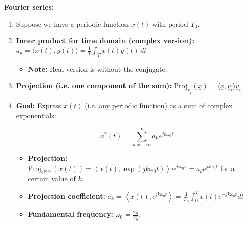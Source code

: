         \begin{example}
            \textbf{Fourier series:}
            \begin{enumerate}
                \item Suppose we have a periodic function $x(t)$ with period $T_0$.

                \begin{center}
                \end{center}

                \item \textbf{Inner product for time domain (complex version):} $a_k = \langle x(t), y(t) \rangle = \frac{1}{T} \int_{T} x(t) \overline{y(t)} \, dt$
                \begin{itemize}
                    \item \textbf{Note:} Real version is without the conjugate.
                \end{itemize}
                \item \textbf{Projection (i.e. one component of the sum):} $\text{Proj}_{\underline{v}_i} (\underline{x}) = \langle \underline{x}, \underline{v}_i \rangle \underline{v}_i$
                
                \item \textbf{Goal:} Express $x(t)$ (i.e. any periodic function) as a sum of complex exponentials:
                
                \[
                x^{*}(t) = \sum_{k=-\infty}^{\infty} a_k e^{jk\omega_0 t}
                \]
                
                \begin{itemize}
                    \item \textbf{Projection:} $\text{Proj}_{e^{j k \omega_0 t}} \left( x(t) \right) = \left\langle x(t), \exp\left( j k \omega_0 t \right) \right\rangle e^{j k \omega_0 t} = a_k e^{j k \omega_0 t}$ for a certain value of $k$.
                    \item \textbf{Projection coefficient:} $a_k = \left\langle x(t), e^{j k \omega_0 t} \right\rangle = \frac{1}{T_0} \int_{0}^{T} x(t) e^{-jk \omega_0 t} dt$
                    \item \textbf{Fundamental frequency:} $\omega_0 = \frac{2\pi}{T_0}$.
                \end{itemize}
        

\end{enumerate}
\end{example}
